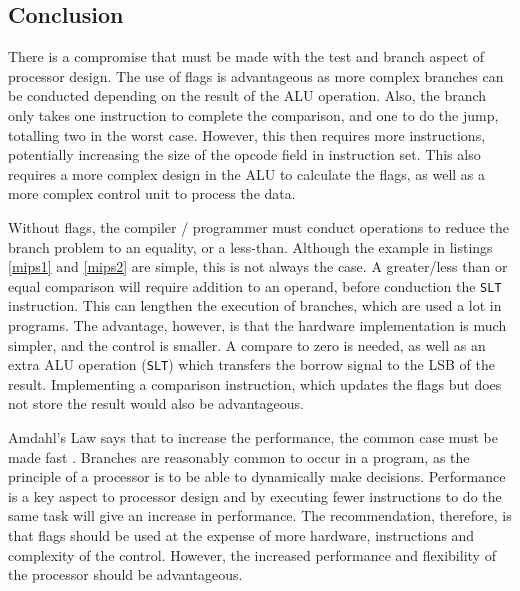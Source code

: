 \documentclass[12pt,a4paper]{article}
\begin{document}
\begin{bibunit}[is-unsrt]
\section{Conclusion}

There is a compromise that must be made with the test and branch aspect of processor design.
The use of flags is advantageous as more complex branches can be conducted depending on the result of the ALU operation.
Also, the branch only takes one instruction to complete the comparison, and one to do the jump, totalling two in the worst case.
However, this then requires more instructions, potentially increasing the size of the opcode field in instruction set.
This also requires a more complex design in the ALU to calculate the flags, as well as a more complex control unit to process the data.

Without flags, the compiler / programmer must conduct operations to reduce the branch problem to an equality, or a less-than. 
Although the example in listings \ref{mips1} and \ref{mips2} are simple, this is not always the case. 
A greater/less than or equal comparison will require addition to an operand, before conduction the \texttt{SLT} instruction.
This can lengthen the execution of branches, which are used a lot in programs.
The advantage, however, is that the hardware implementation is much simpler, and the control is smaller.
A compare to zero is needed, as well as an extra ALU operation (\texttt{SLT}) which transfers the borrow signal to the LSB of the result. 
Implementing a comparison instruction, which updates the flags but does not store the result would also be advantageous. 


Amdahl's Law says that to increase the performance, the common case must be made fast \cite{amdahl}.
Branches are reasonably common to occur in a program, as the principle of a processor is to be able to dynamically make decisions. 
Performance is a key aspect to processor design and by executing fewer instructions to do the same task will give an increase in performance.
The recommendation, therefore, is that flags should be used at the expense of more hardware, instructions and complexity of the control.
However, the increased performance and flexibility of the processor should be advantageous.

\putbib[references]
\end{bibunit}
\end{document}
